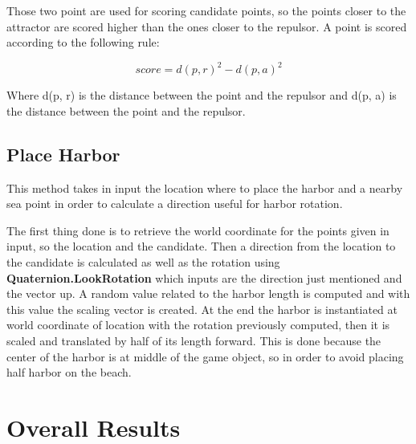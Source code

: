 \documentclass[12pt]{article}
\begin{document}
    Those two point are used for scoring candidate points, so the points closer to the attractor are scored higher than the ones closer to the repulsor. A point is scored 
    according to the following rule:

    \begin{equation}
        score = d(p, r)^2 - d(p, a)^2
    \end{equation}

    \noindent
    Where d(p, r) is the distance between the point and the repulsor and d(p, a) is the distance between the point and the repulsor.

    \subsection{Place Harbor} \label{section:PlaceHarbor}
    This method takes in input the location where to place the harbor and a nearby sea point in order to calculate a direction useful for harbor rotation.
    
    The first thing done is to retrieve the world coordinate for the points given in input, so the location and the candidate. Then a direction from the location to the 
    candidate is calculated as well as the rotation using \textbf{Quaternion.LookRotation} which inputs are the direction just mentioned and the vector up. A random value 
    related to the harbor length is computed and with this value the scaling vector is created. At the end the harbor is instantiated at world coordinate of location with 
    the rotation previously computed, then it is scaled and translated by half of its length forward. This is done because the center of the harbor is at middle of the game
    object, so in order to avoid placing half harbor on the beach.

    \section{Overall Results}

    \newpage
    
    
\end{document}
